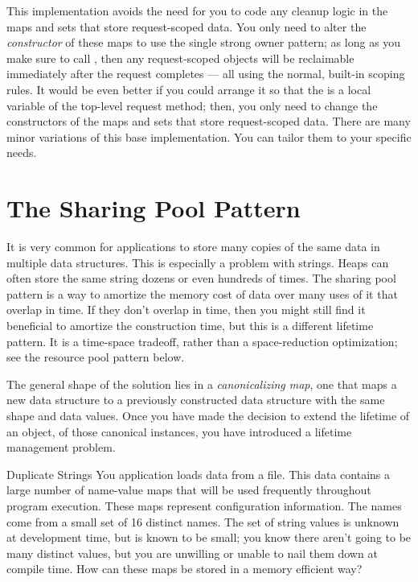 This implementation avoids the need for you to code any cleanup logic in the maps
and sets that store request-scoped data. You only need to alter the
\emph{constructor} of these maps to use the single strong owner pattern; as long
as you make sure to call , then any request-scoped
objects will be reclaimable immediately after the request completes --- all using
the normal, built-in scoping rules. It would be even better if you could arrange
it so that the  is a local variable of the
top-level request method; then, you only need to change the constructors of the
maps and sets that store request-scoped data. There are many minor variations of
this base implementation. You can tailor them to your specific needs.


\section{The Sharing Pool Pattern}
\label{sec:sharing-pools}

 It is very common for
applications to store many copies of the same data in multiple data structures.
This is especially a problem with strings. Heaps can often store the same string
dozens or even hundreds of times. The sharing pool pattern is a way to amortize
the memory cost of data over many uses of it that overlap in time. If they don't
overlap in time, then you might still find it beneficial to amortize the
construction time, but this is a different lifetime pattern. It is a time-space
tradeoff, rather than a space-reduction optimization; see the resource pool
pattern below.

The general shape of the solution lies in a \emph{canonicalizing map}, one that
maps a new data structure to a previously constructed data structure with the
same shape and data values. Once you have made the decision to extend the
lifetime of an object, of those canonical instances, you have introduced a
lifetime management problem.


\begin{example}{Duplicate Strings}
You application loads data from a file. This data contains a large number of
name-value maps that will be used frequently throughout program execution.
These maps represent configuration information. The names come from a small set
of 16 distinct names. The set of string values 
is unknown at development time, but is known to be small;
you know there aren't going to be many distinct values, but you are unwilling or
unable to nail them down at compile time. How can these maps be stored in a memory
efficient way?
\end{example}


